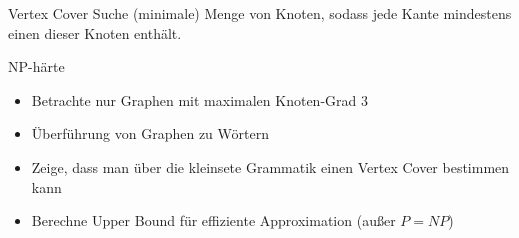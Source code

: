 \documentclass[xcolor=dvipsnames]{beamer}
\begin{document}
\begin{frame}{\FrameName}
\begin{block}{Vertex Cover}
	\Gap
	Suche (minimale) Menge von Knoten, sodass jede Kante mindestens einen dieser Knoten enthält.\linebreak
	$ $\linebreak
	
\end{block}
\end{frame}

\newcommand{\ExampleGraphV}{V = \{a,b,c,d\}}
\newcommand{\ExampleGraphE}{E = 
	\begin{Bmatrix}
		\{a,b\},
		\{a,c\},
		\{b,c\},
		\{b,d\}
	\end{Bmatrix}
}

\begin{frame}{\FrameName}
\begin{block}{NP-härte}
	\begin{itemize}[<+->]
			\item Betrachte nur Graphen mit maximalen Knoten-Grad 3
			\item Überführung von Graphen zu Wörtern
			\item Zeige, dass man über die kleinsete Grammatik einen Vertex Cover bestimmen kann
			\item Berechne Upper Bound für effiziente Approximation \linebreak (außer $P=NP$)
		\end{itemize}
\end{block}
\end{frame}
\end{document}
